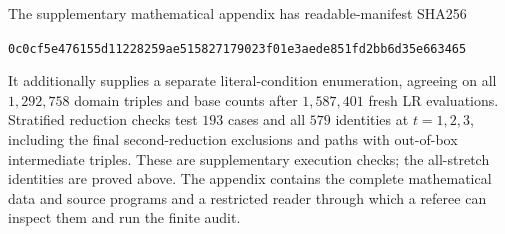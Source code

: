 \documentclass[11pt]{article}
\begin{document}
The supplementary mathematical appendix has readable-manifest SHA256
\begin{center}\small\texttt{0c0cf5e476155d11228259ae515827179023f01e3aede851fd2bb6d35e663465}\end{center}
It additionally supplies a separate literal-condition enumeration, agreeing
on all $1{,}292{,}758$ domain triples and base counts after $1{,}587{,}401$
fresh LR evaluations. Stratified reduction checks test $193$ cases and all
$579$ identities at $t=1,2,3$, including the final second-reduction exclusions
and paths with out-of-box intermediate triples. These are supplementary
execution checks; the all-stretch identities are proved above. The appendix
contains the complete mathematical data and source programs and a restricted
reader through which a referee can inspect them and run the finite audit.
\end{document}

